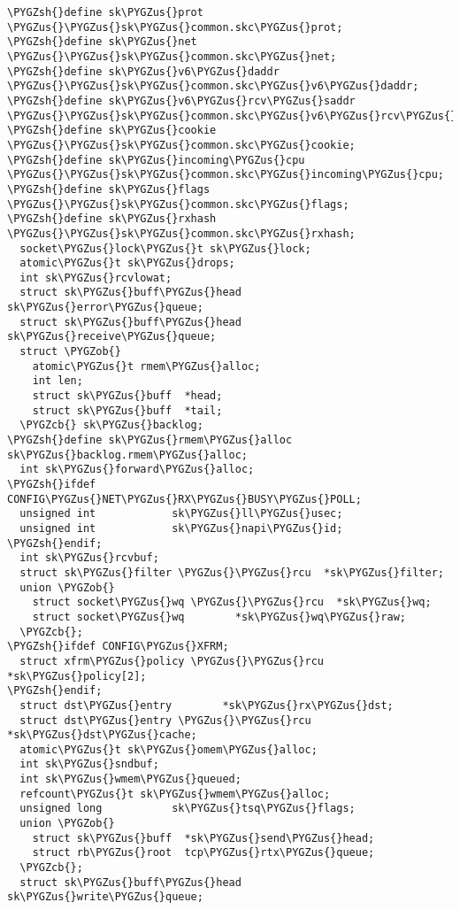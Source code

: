 \documentclass[a4paper,8pt,english]{sphinxmanual}
\def\PYGZus{\char`\_}
\def\PYGZob{\char`\{}
\def\PYGZcb{\char`\}}
\def\PYGZsh{\char`\#}
\begin{document}
\begin{Verbatim}[commandchars=\\\{\}]
\PYGZsh{}define sk\PYGZus{}prot                 \PYGZus{}\PYGZus{}sk\PYGZus{}common.skc\PYGZus{}prot;
\PYGZsh{}define sk\PYGZus{}net                  \PYGZus{}\PYGZus{}sk\PYGZus{}common.skc\PYGZus{}net;
\PYGZsh{}define sk\PYGZus{}v6\PYGZus{}daddr             \PYGZus{}\PYGZus{}sk\PYGZus{}common.skc\PYGZus{}v6\PYGZus{}daddr;
\PYGZsh{}define sk\PYGZus{}v6\PYGZus{}rcv\PYGZus{}saddr \PYGZus{}\PYGZus{}sk\PYGZus{}common.skc\PYGZus{}v6\PYGZus{}rcv\PYGZus{}saddr;
\PYGZsh{}define sk\PYGZus{}cookie               \PYGZus{}\PYGZus{}sk\PYGZus{}common.skc\PYGZus{}cookie;
\PYGZsh{}define sk\PYGZus{}incoming\PYGZus{}cpu         \PYGZus{}\PYGZus{}sk\PYGZus{}common.skc\PYGZus{}incoming\PYGZus{}cpu;
\PYGZsh{}define sk\PYGZus{}flags                \PYGZus{}\PYGZus{}sk\PYGZus{}common.skc\PYGZus{}flags;
\PYGZsh{}define sk\PYGZus{}rxhash               \PYGZus{}\PYGZus{}sk\PYGZus{}common.skc\PYGZus{}rxhash;
  socket\PYGZus{}lock\PYGZus{}t sk\PYGZus{}lock;
  atomic\PYGZus{}t sk\PYGZus{}drops;
  int sk\PYGZus{}rcvlowat;
  struct sk\PYGZus{}buff\PYGZus{}head     sk\PYGZus{}error\PYGZus{}queue;
  struct sk\PYGZus{}buff\PYGZus{}head     sk\PYGZus{}receive\PYGZus{}queue;
  struct \PYGZob{}
    atomic\PYGZus{}t rmem\PYGZus{}alloc;
    int len;
    struct sk\PYGZus{}buff  *head;
    struct sk\PYGZus{}buff  *tail;
  \PYGZcb{} sk\PYGZus{}backlog;
\PYGZsh{}define sk\PYGZus{}rmem\PYGZus{}alloc sk\PYGZus{}backlog.rmem\PYGZus{}alloc;
  int sk\PYGZus{}forward\PYGZus{}alloc;
\PYGZsh{}ifdef CONFIG\PYGZus{}NET\PYGZus{}RX\PYGZus{}BUSY\PYGZus{}POLL;
  unsigned int            sk\PYGZus{}ll\PYGZus{}usec;
  unsigned int            sk\PYGZus{}napi\PYGZus{}id;
\PYGZsh{}endif;
  int sk\PYGZus{}rcvbuf;
  struct sk\PYGZus{}filter \PYGZus{}\PYGZus{}rcu  *sk\PYGZus{}filter;
  union \PYGZob{}
    struct socket\PYGZus{}wq \PYGZus{}\PYGZus{}rcu  *sk\PYGZus{}wq;
    struct socket\PYGZus{}wq        *sk\PYGZus{}wq\PYGZus{}raw;
  \PYGZcb{};
\PYGZsh{}ifdef CONFIG\PYGZus{}XFRM;
  struct xfrm\PYGZus{}policy \PYGZus{}\PYGZus{}rcu *sk\PYGZus{}policy[2];
\PYGZsh{}endif;
  struct dst\PYGZus{}entry        *sk\PYGZus{}rx\PYGZus{}dst;
  struct dst\PYGZus{}entry \PYGZus{}\PYGZus{}rcu  *sk\PYGZus{}dst\PYGZus{}cache;
  atomic\PYGZus{}t sk\PYGZus{}omem\PYGZus{}alloc;
  int sk\PYGZus{}sndbuf;
  int sk\PYGZus{}wmem\PYGZus{}queued;
  refcount\PYGZus{}t sk\PYGZus{}wmem\PYGZus{}alloc;
  unsigned long           sk\PYGZus{}tsq\PYGZus{}flags;
  union \PYGZob{}
    struct sk\PYGZus{}buff  *sk\PYGZus{}send\PYGZus{}head;
    struct rb\PYGZus{}root  tcp\PYGZus{}rtx\PYGZus{}queue;
  \PYGZcb{};
  struct sk\PYGZus{}buff\PYGZus{}head     sk\PYGZus{}write\PYGZus{}queue;

\end{Verbatim}
\end{document}
